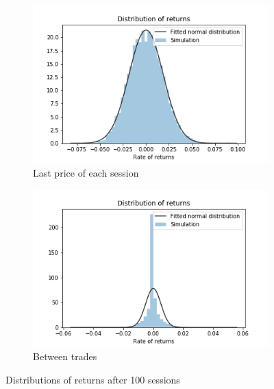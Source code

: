 

\begin{figure}
    \centering
    \begin{subfigure}{.5\textwidth}
        \centering
        \includegraphics[width=\linewidth]{plots/basic_fat_tails_per_session.png}
        \caption{Last price of each session}
        \label{fig:basic_return_distr_per_session}
    \end{subfigure}%
    \begin{subfigure}{.5\textwidth}
        \centering
        \includegraphics[width=\linewidth]{plots/basic_fat_tails_intrasession.png}
        \caption{Between trades}
        \label{fig:basic_return_distr_intrasession}
    \end{subfigure}
    \caption{Distributions of returns after 100 sessions}
    \label{fig:basic_return_distr}
\end{figure}

